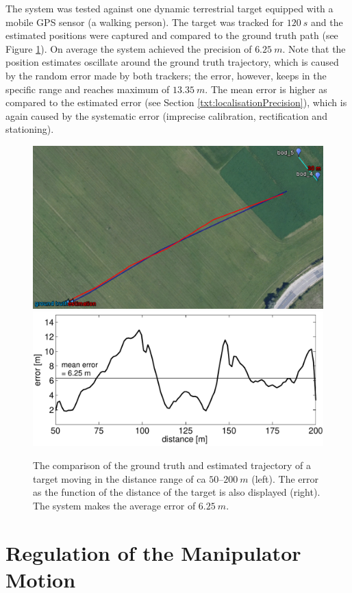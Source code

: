 The system was tested against one dynamic terrestrial target equipped with a mobile GPS sensor (a walking person). The target was tracked for $120~s$ and the estimated positions were captured and compared to the ground truth path (see Figure \ref{fig:resultsWalking}). On average the system achieved the precision of $6.25~m$. Note that the position estimates oscillate around the ground truth trajectory, which is caused by the random error made by both trackers; the error, however, keeps in the specific range and reaches maximum of $13.35~m$. The mean error is higher as compared to the estimated error (see Section \ref{txt:localisationPrecision}), which is again caused by the systematic error (imprecise calibration, rectification and stationing).

\begin{figure}[htb]\centering
	\centering
	\includegraphics[width=0.44\linewidth]{fig/eval_walking.png}
	\includegraphics[width=0.54\linewidth]{fig/eval_walking_error.pdf}
	\caption{The comparison of the ground truth and estimated trajectory of a target moving in the distance range of ca $50$--$200~m$ (left). The error as the function of the distance of the target is also displayed (right). The system makes the average error of $6.25~m$.}
	\label{fig:resultsWalking}
\end{figure}

\section{Regulation of the Manipulator Motion} \label{txt:test_regulation}

\vata[7]


